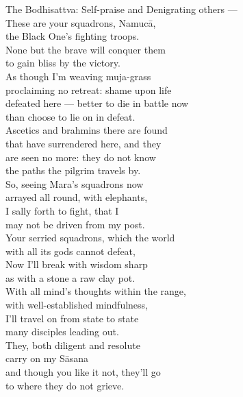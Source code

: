 \begin{MyDescription}[]{The Bodhisattva:}
Self-praise and Denigrating others —\\
These are your squadrons, Namuc\=a,\\
the Black One's fighting troops.\\
None but the brave will conquer them\\
to gain bliss by the victory.\\
As though I'm weaving muja-grass\\
proclaiming no retreat: shame upon life\\
defeated here — better to die in battle now\\
than choose to lie on in defeat.\\
Ascetics and brahmins there are found\\
that have surrendered here, and they\\
are seen no more: they do not know\\
the paths the pilgrim travels by.\\
So, seeing Mara's squadrons now\\
arrayed all round, with elephants,\\
I sally forth to ﬁght, that I\\
may not be driven from my post.\\
Your serried squadrons, which the world\\
with all its gods cannot defeat,\\
Now I'll break with wisdom sharp\\
as with a stone a raw clay pot.\\
With all mind's thoughts within the range,\\
with well-established mindfulness,\\
I'll travel on from state to state\\
many disciples leading out.\\
They, both diligent and resolute\\
carry on my S\=asana\\
and though you like it not, they'll go\\
to where they do not grieve.
\end{MyDescription}


